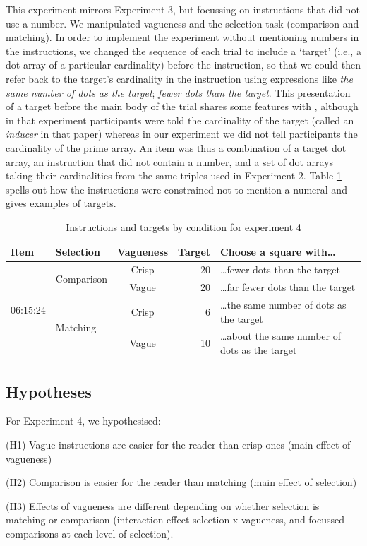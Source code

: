 \documentclass[%
man,		%
floatsintext,%
apacite%
]{apa6}
\begin{document}
This experiment mirrors Experiment 3, but focussing on instructions that did not use a number. 
We manipulated vagueness and the selection task (comparison and matching). 
In order to implement the experiment without mentioning numbers in the instructions, we changed the sequence of each trial to include a `target' (i.e., a dot array of a particular cardinality) before the instruction, so that we could then refer back to the target's cardinality in the instruction using expressions like \emph{the same number of dots as the target}; \emph{fewer dots than the target}.
%
This presentation of a target before the main body of the trial shares some features with , although in that experiment participants were told the cardinality of the target (called an \emph{inducer} in that paper) whereas in our experiment we did not tell participants the cardinality of the prime array.
An item was thus a combination of a target dot array, an instruction that did not contain a number, and a set of dot arrays taking their cardinalities from the same triples used in Experiment 2.
Table \ref{Instructions for e4} spells out how the instructions were constrained not to mention a numeral and gives examples of targets.

\begin{table}[htp]
\caption{Instructions and targets by condition for experiment 4}
\begin{center}
\begin{tabular}{llcrl}
Item					&Selection				&Vagueness	&Target	&Choose a square with\ldots						\\
\toprule
\multirow{4}{*}{06:15:24} 	&\multirow{2}{*}{Comparison} 	&Crisp		&20		&\ldots fewer dots than the target					\\
\cline{3-5}
					&						&Vague		&20		&\ldots far fewer dots than the target					\\
					\cline{2-5}
					&\multirow{2}{*}{Matching}		& Crisp		&6		&\ldots the same number of dots as the target			\\
					\cline{3-5}
					& 		 				&Vague		&10 		&\ldots about the same number of dots as the target		\\
					\bottomrule
\end{tabular}
\end{center}
\label{Instructions for e4}
\end{table}%
	
\subsection{Hypotheses}%
\noindent For Experiment 4, we hypothesised:
{\small
\begin{APAenumerate}
	\item [(H1)] Vague instructions are easier for the reader than crisp ones (main effect of vagueness)
	\item [(H2)] Comparison is easier for the reader than matching (main effect of selection)
	\item [(H3)] Effects of vagueness are different depending on whether selection is matching or comparison (interaction effect selection x vagueness, and focussed comparisons at each level of selection).
\end{APAenumerate}
}
\end{document}
